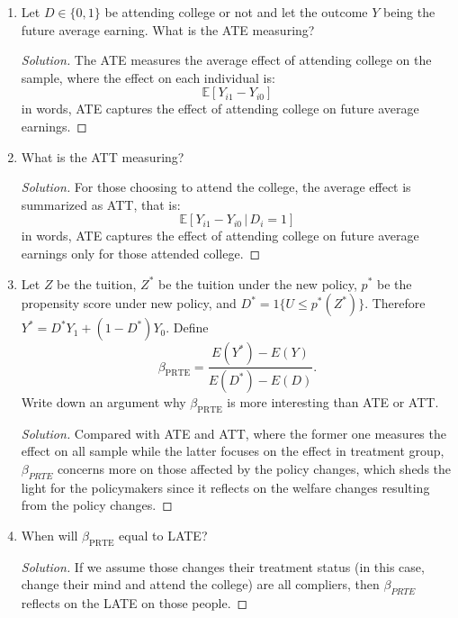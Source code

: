 \documentclass[11pt]{article}
\newenvironment{solution}{%
  \renewcommand\qedsymbol{$\blacksquare$}%
  \begin{mdframed}[backgroundcolor=gray!15]%
  \begin{proof}[Solution]}%
  {\end{proof}%
  \end{mdframed}}%
\newcommand{\ept}{\mathbb{E}}
\newcommand{\given}{\,|\,}
\begin{document}
    \begin{enumerate}

        \item Let $D \in \{0,1\}$ be attending college or not and let the outcome $Y$ being the future average earning. What is the ATE measuring?
        
            \begin{solution}
                The ATE measures the average effect of attending college on the sample, where the effect on each individual is:
                \[
                    \ept[Y_{i1} - Y_{i0}]
                \]
                in words, ATE captures the effect of attending college on future average earnings.
            \end{solution}
        
        \item What is the ATT measuring?
        
            \begin{solution}
                For those choosing to attend the college, the average effect is summarized as ATT, that is:
                \[
                    \ept[Y_{i1} - Y_{i0} \given D_i = 1]
                \]
                in words, ATE captures the effect of attending college on future average earnings only for those attended college.
            \end{solution}
        
        \item Let $Z$ be the tuition, $Z^*$ be the tuition under the new policy, $p^*$ be the propensity score under new policy, and $D^* = 1\{U \leq p^*(Z^*)\}$. Therefore $Y^* = D^*Y_1 + (1-D^*)Y_0$. Define
        \[\beta_{\text{PRTE}} = \frac{E(Y^*)-E(Y)}{E(D^*)-E(D)}.\]
        Write down an argument why $\beta_{\text{PRTE}}$ is more interesting than ATE or ATT.

            \begin{solution}
                Compared with ATE and ATT, where the former one measures the effect on all sample while the latter focuses on the effect in treatment group, $\beta_{PRTE}$ concerns more on those affected by the policy changes, which sheds the light for the policymakers since it reflects on the welfare changes resulting from the policy changes.
            \end{solution}
        
        \item When will $\beta_{\text{PRTE}}$ equal to LATE?
        
            \begin{solution}
                If we assume those changes their treatment status (in this case, change their mind and attend the college) are all compliers, then $\beta_{PRTE}$ reflects on the LATE on those people.
            \end{solution}

    \end{enumerate}
\end{document}
